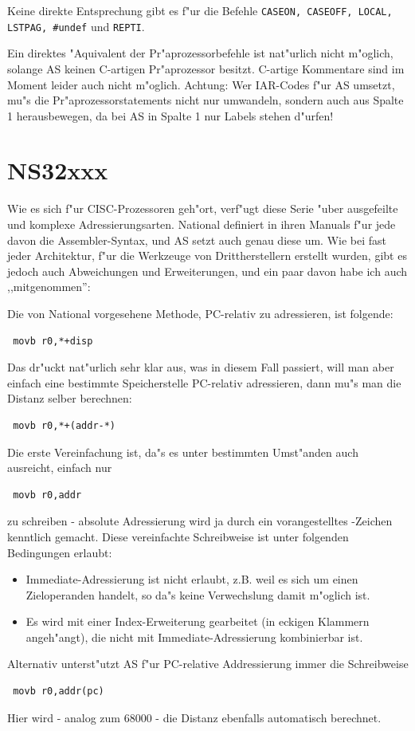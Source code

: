 \documentclass[12pt,a4paper,twoside]{report}
\newcommand{\asname}{AS}
\begin{document}
Keine direkte Entsprechung gibt es f"ur die Befehle {\tt CASEON, CASEOFF,
LOCAL, LSTPAG, \#undef} und {\tt REPTI}.

Ein direktes "Aquivalent der Pr"aprozessorbefehle ist nat"urlich nicht
m"oglich, solange \asname{} keinen C-artigen Pr"aprozessor besitzt.  C-artige
Kommentare sind im Moment leider auch nicht m"oglich.  Achtung: Wer
IAR-Codes f"ur \asname{} umsetzt, mu"s die Pr"aprozessorstatements nicht nur
umwandeln, sondern auch aus Spalte 1 herausbewegen, da bei \asname{} in Spalte 1
nur Labels stehen d"urfen!


\section{NS32xxx}

Wie es sich f"ur CISC-Prozessoren geh"ort, verf"ugt diese Serie "uber ausgefeilte
und komplexe Adressierungsarten.  National definiert in ihren Manuals f"ur
jede davon die Assembler-Syntax, und \asname{} setzt auch genau diese um.  Wie bei
fast jeder Architektur, f"ur die Werkzeuge von Drittherstellern erstellt wurden,
gibt es jedoch auch Abweichungen und Erweiterungen, und ein paar davon habe
ich auch ,,mitgenommen'':

Die von National vorgesehene Methode, PC-relativ zu adressieren, ist folgende:
\begin{verbatim}
 movb r0,*+disp
\end{verbatim}
Das dr"uckt nat"urlich sehr klar aus, was in diesem Fall passiert, will man aber
einfach eine bestimmte Speicherstelle PC-relativ adressieren, dann mu"s man die
Distanz selber berechnen:
\begin{verbatim}
 movb r0,*+(addr-*)
\end{verbatim}
Die erste Vereinfachung ist, da"s es unter bestimmten Umst"anden auch ausreicht,
einfach nur
\begin{verbatim}
 movb r0,addr
\end{verbatim}
zu schreiben - absolute Adressierung wird ja durch ein vorangestelltes \@-Zeichen
kenntlich gemacht.  Diese vereinfachte Schreibweise ist unter folgenden Bedingungen
erlaubt:
\begin{itemize}
\item{Immediate-Adressierung ist nicht erlaubt, z.B. weil es sich um einen
      Zieloperanden handelt, so da"s keine Verwechslung damit m"oglich ist.}
\item{Es wird mit einer Index-Erweiterung gearbeitet (in eckigen Klammern angeh"angt),
      die nicht mit Immediate-Adressierung kombinierbar ist.}
\end{itemize}
Alternativ unterst"utzt \asname{} f"ur PC-relative Addressierung immer die Schreibweise
\begin{verbatim}
 movb r0,addr(pc)
\end{verbatim}
Hier wird - analog zum 68000 - die Distanz ebenfalls automatisch berechnet.
\end{document}
